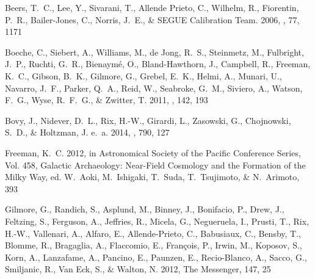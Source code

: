 \documentclass[12pt, preprint]{aastex}
\begin{document}
\begin{thebibliography}{24}
{Beers}, T.~C., {Lee}, Y., {Sivarani}, T., {Allende Prieto}, C., {Wilhelm}, R.,
  {Fiorentin}, P.~R., {Bailer-Jones}, C., {Norris}, J.~E., \& {SEGUE
  Calibration Team}. 2006, \memsai, 77, 1171

{Boeche}, C., {Siebert}, A., {Williams}, M., {de Jong}, R.~S., {Steinmetz}, M.,
  {Fulbright}, J.~P., {Ruchti}, G.~R., {Bienaym{\'e}}, O., {Bland-Hawthorn},
  J., {Campbell}, R., {Freeman}, K.~C., {Gibson}, B.~K., {Gilmore}, G.,
  {Grebel}, E.~K., {Helmi}, A., {Munari}, U., {Navarro}, J.~F., {Parker},
  Q.~A., {Reid}, W., {Seabroke}, G.~M., {Siviero}, A., {Watson}, F.~G., {Wyse},
  R.~F.~G., \& {Zwitter}, T. 2011, \aj, 142, 193

{Bovy}, J., {Nidever}, D.~L., {Rix}, H.-W., {Girardi}, L., {Zasowski}, G.,
  {Chojnowski}, S.~D., \& {Holtzman}, J. e.~a. 2014, \apj, 790, 127

{Freeman}, K.~C. 2012, in Astronomical Society of the Pacific Conference
  Series, Vol. 458, Galactic Archaeology: Near-Field Cosmology and the
  Formation of the Milky Way, ed. W.~{Aoki}, M.~{Ishigaki}, T.~{Suda},
  T.~{Tsujimoto}, \& N.~{Arimoto}, 393

{Gilmore}, G., {Randich}, S., {Asplund}, M., {Binney}, J., {Bonifacio}, P.,
  {Drew}, J., {Feltzing}, S., {Ferguson}, A., {Jeffries}, R., {Micela}, G.,
  {Negueruela}, I., {Prusti}, T., {Rix}, H.-W., {Vallenari}, A., {Alfaro}, E.,
  {Allende-Prieto}, C., {Babusiaux}, C., {Bensby}, T., {Blomme}, R.,
  {Bragaglia}, A., {Flaccomio}, E., {Fran{\c c}ois}, P., {Irwin}, M.,
  {Koposov}, S., {Korn}, A., {Lanzafame}, A., {Pancino}, E., {Paunzen}, E.,
  {Recio-Blanco}, A., {Sacco}, G., {Smiljanic}, R., {Van Eck}, S., \& {Walton},
  N. 2012, The Messenger, 147, 25


\end{thebibliography}
\end{document}
